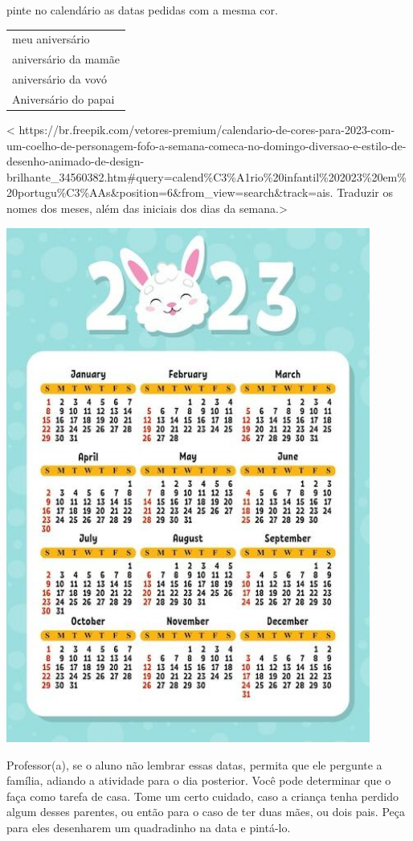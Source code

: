 pinte no calendário as datas pedidas com a mesma cor.

\begin{longtable}[]{@{}l@{}}
\toprule
meu aniversário\tabularnewline
aniversário da mamãe\tabularnewline
aniversário da vovó\tabularnewline
Aniversário do papai\tabularnewline
\bottomrule
\end{longtable}

\textless{}
https://br.freepik.com/vetores-premium/calendario-de-cores-para-2023-com-um-coelho-de-personagem-fofo-a-semana-comeca-no-domingo-diversao-e-estilo-de-desenho-animado-de-design-brilhante\_34560382.htm\#query=calend\%C3\%A1rio\%20infantil\%202023\%20em\%20portugu\%C3\%AAs\&position=6\&from\_view=search\&track=ais.
Traduzir os nomes dos meses, além das iniciais dos dias da
semana.\textgreater{}

\includegraphics[width=4.71050in,height=6.67143in]{media/image35.jpg}

Professor(a), se o aluno não lembrar essas datas, permita que ele
pergunte a família, adiando a atividade para o dia posterior. Você pode
determinar que o faça como tarefa de casa. Tome um certo cuidado, caso a
criança tenha perdido algum desses parentes, ou então para o caso de ter
duas mães, ou dois pais. Peça para eles desenharem um quadradinho na
data e pintá-lo.

